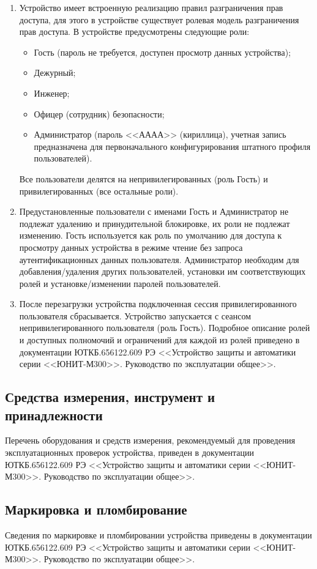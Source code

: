\documentclass[a4paper, 12pt,table, hidelinks, DIV=calc]{extarticle} %
\begin{document}
\begin{enumerate}[label=\arabic{section}.\arabic{subsection}.\arabic*, labelsep=4pt, leftmargin=0pt, itemindent=57pt]
\item Устройство имеет встроенную реализацию правил разграничения прав доступа, для этого в устройстве существует ролевая модель разграничения прав доступа.
В устройстве предусмотрены следующие роли:
\begin{itemize}
    \item Гость (пароль не требуется, доступен просмотр данных устройства);
    \item Дежурный;
    \item Инженер;
    \item Офицер (сотрудник) безопасности;
    \item Администратор (пароль <<АААА>> (кириллица), учетная запись предназначена для первоначального конфигурирования штатного профиля пользователей).
\end{itemize}
Все пользователи делятся на непривилегированных (роль Гость) и привилегированных (все остальные роли).
\item
Предустановленные пользователи с именами Гость и Администратор не подлежат удалению и принудительной блокировке, их роли не подлежат изменению. Гость используется как роль по умолчанию для доступа к просмотру данных устройства в режиме чтение без запроса аутентификационных данных пользователя. Администратор необходим для добавления/удаления других пользователей, установки им соответствующих ролей и установке/изменении паролей пользователей.
\item
После перезагрузки устройства подключенная сессия привилегированного пользователя сбрасывается. Устройство запускается с сеансом непривилегированного пользователя (роль Гость).
Подробное описание ролей и доступных полномочий и ограничений для каждой из ролей приведено в документации ЮТКБ.656122.609 РЭ <<Устройство защиты и автоматики серии <<ЮНИТ-М300>>. Руководство по эксплуатации общее>>.

\end{enumerate}

\color{uniblue}\subsection{Средства измерения, инструмент и принадлежности}\color{black}
Перечень оборудования и средств измерения, рекомендуемый для проведения эксплуатационных проверок устройства, приведен в документации ЮТКБ.656122.609 РЭ <<Устройство защиты и автоматики серии <<ЮНИТ-М300>>. Руководство по эксплуатации общее>>.

\color{uniblue}\subsection{Маркировка и пломбирование}\color{black}
Сведения по маркировке и пломбировании устройства приведены в документации ЮТКБ.656122.609 РЭ <<Устройство защиты и автоматики серии <<ЮНИТ-М300>>. Руководство по эксплуатации общее>>.
\end{document}
